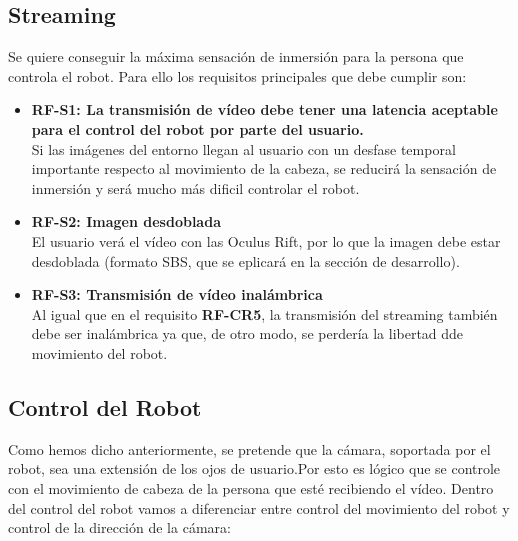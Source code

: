 \documentclass[twoside, 11pt]{epstfg}
\begin{document}
\subsection{Streaming}
Se quiere conseguir la máxima sensación de inmersión para la persona que controla el robot.
Para ello los requisitos principales que debe cumplir son:

\begin{itemize}
	\item\textbf{RF-S1: La transmisión de vídeo debe tener una latencia aceptable para el control del robot por parte del usuario.}\\
	Si las imágenes del entorno llegan al usuario con un desfase temporal importante respecto al movimiento de la cabeza, se reducirá la sensación de inmersión y será mucho más dificil controlar el robot.
	
	\item\textbf{RF-S2: Imagen desdoblada}\\
	El usuario verá el vídeo con las Oculus Rift, por lo que la imagen debe estar desdoblada (formato SBS, que se eplicará en la sección de desarrollo).
	
	\item\textbf{RF-S3: Transmisión de vídeo inalámbrica}\\
	Al igual que en el requisito \textbf{RF-CR5}, la transmisión del streaming también debe ser inalámbrica ya que, de otro modo, se perdería la libertad dde movimiento del robot.

	
	
\end{itemize}



\subsection{Control del Robot}

Como hemos dicho anteriormente, se pretende que la cámara, soportada por el robot, sea una extensión de los ojos de usuario.Por esto es lógico que se controle con el movimiento de cabeza de la persona que esté recibiendo el vídeo.
Dentro del control del robot vamos a diferenciar entre control del movimiento del robot y control de la dirección de la cámara:
\end{document}
